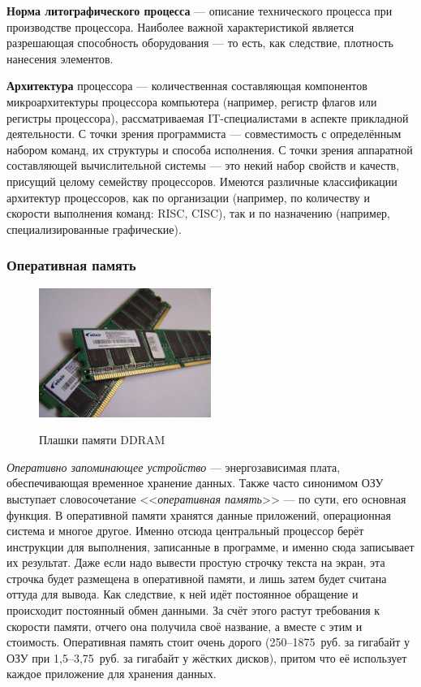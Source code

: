 \textbf{Норма литографического процесса} --- описание технического процесса при производстве процессора. Наиболее важной характеристикой является разрешающая способность оборудования --- то есть, как следствие, плотность нанесения элементов.

\textbf{Архитектура} процессора --- количественная составляющая компонентов микроархитектуры процессора компьютера (например, регистр флагов или регистры процессора), рассматриваемая IT-специалистами в аспекте прикладной деятельности.
С точки зрения программиста --- совместимость с определённым набором команд, их структуры и способа исполнения.
С точки зрения аппаратной составляющей вычислительной системы --- это некий набор свойств и качеств, присущий целому семейству процессоров.
Имеются различные классификации архитектур процессоров, как по организации (например, по количеству и скорости выполнения команд: RISC, CISC), так и по назначению (например, специализированные графические).

\subsubsection{Оперативная память}\label{base:introduction:components:ram}
\begin{figure}[h!]
 \centering
 \includegraphics[width=0.5\textwidth]{base/Introduction/Memory.jpg}
 \label{base:introduction:components:ram:rampic}
 \caption{Плашки памяти DDRAM}
\end{figure}
\emph{Оперативно запоминающее устройство} --- энергозависимая плата, обеспечивающая временное хранение данных. Также часто синонимом ОЗУ выступает словосочетание <<\emph{оперативная память}>> --- по сути, его основная функция.
В оперативной памяти хранятся данные приложений, операционная система и многое другое.
Именно отсюда центральный процессор берёт инструкции для выполнения, записанные в программе, и именно сюда записывает их результат.
Даже если надо вывести простую строчку текста на экран, эта строчка будет размещена в оперативной памяти, и лишь затем будет считана оттуда для вывода.
Как следствие, к ней идёт постоянное обращение и происходит постоянный обмен данными.
За счёт этого растут требования к скорости памяти, отчего она получила своё название, а вместе с этим и стоимость.
Оперативная память стоит очень дорого (250--1875~руб. за гигабайт у ОЗУ при 1,5--3,75~руб. за гигабайт у жёстких дисков), притом что её использует каждое приложение для хранения данных.

